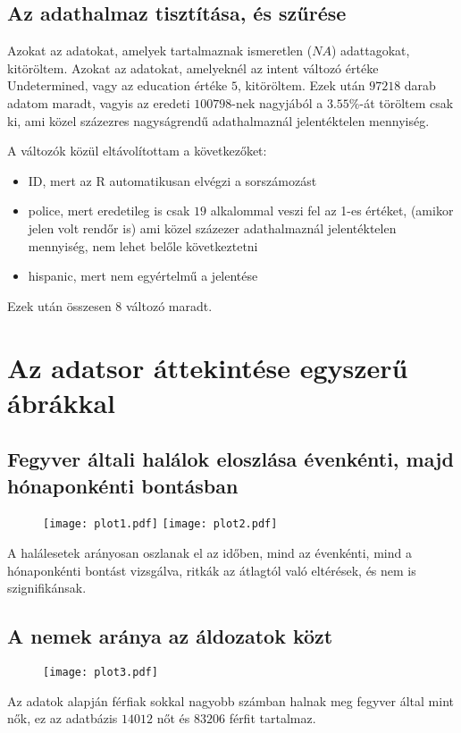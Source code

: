 \documentclass{article}
\begin{document}
\subsection{Az adathalmaz tisztítása, és szűrése}

Azokat az adatokat, amelyek tartalmaznak ismeretlen ($NA$) adattagokat, kitöröltem. Azokat az adatokat, amelyeknél az intent változó értéke Undetermined, vagy az education értéke $5$, kitöröltem. Ezek után $97218$ darab adatom maradt, vagyis az eredeti $100798$-nek nagyjából a $3.55\%$-át töröltem csak ki, ami közel százezres nagyságrendű adathalmaznál jelentéktelen mennyiség. \par
A változók közül eltávolítottam a következőket:
\begin{itemize}
	\item ID, mert az R automatikusan elvégzi a sorszámozást
	\item police, mert eredetileg is csak $19$ alkalommal veszi fel az 1-es értéket, (amikor jelen volt rendőr is) ami közel százezer adathalmaznál jelentéktelen mennyiség, nem lehet belőle következtetni
	\item hispanic, mert nem egyértelmű a jelentése
\end{itemize}
\par
Ezek után összesen $8$ változó maradt.

\section{Az adatsor áttekintése egyszerű ábrákkal}
\subsection{Fegyver általi halálok eloszlása évenkénti, majd hónaponkénti bontásban}

\begin{figure}[h]
\texttt{[image: plot1.pdf]}
\texttt{[image: plot2.pdf]}
\end{figure}

A halálesetek arányosan oszlanak el az időben, mind az évenkénti, mind a hónaponkénti bontást vizsgálva, ritkák az átlagtól való eltérések, és nem is szignifikánsak.

\subsection{A nemek aránya az áldozatok közt}

\begin{minipage}{0.5\textwidth}
\begin{figure}[H]
\texttt{[image: plot3.pdf]}
\end{figure}
\end{minipage} \hfill
\begin{minipage}{0.45\textwidth}
Az adatok alapján férfiak sokkal nagyobb számban halnak meg fegyver által mint nők, ez az adatbázis $14012$ nőt és  $83206$ férfit tartalmaz.
\end{minipage}
\end{document}
